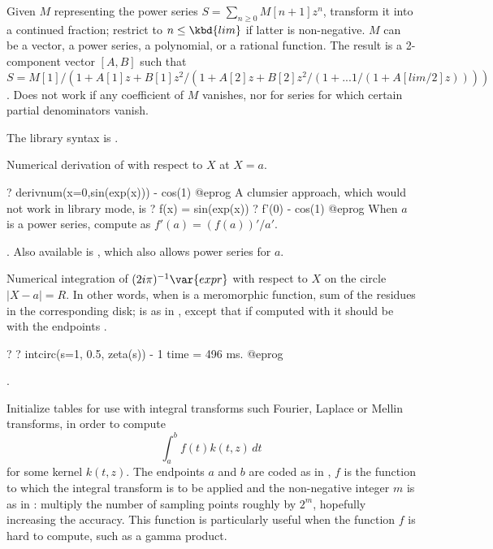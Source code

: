 \label{se:contfracinit}
Given $M$ representing the power series $S=\sum_{n\ge0} M[n+1]z^n$,
transform it into a continued fraction; restrict to $n\leq \kbd{lim}$
if latter is non-negative. $M$ can be a vector, a power
series, a polynomial, or a rational function.
The result is a 2-component vector $[A,B]$ such that
$S = M[1] / (1+A[1]z+B[1]z^2/(1+A[2]z+B[2]z^2/(1+...1/(1+A[lim/2]z))))$.
Does not work if any coefficient of $M$ vanishes, nor for series for
which certain partial denominators vanish.

The library syntax is .

\label{se:derivnum}
Numerical derivation of  with respect to $X$ at $X=a$.

\bprog
? derivnum(x=0,sin(exp(x))) - cos(1)
@eprog
A clumsier approach, which would not work in library mode, is
\bprog
? f(x) = sin(exp(x))
? f'(0) - cos(1)
@eprog
When $a$ is a power series, compute  as $f'(a) =
(f(a))'/a'$.

. Also
available is , which also allows power series for $a$.

\label{se:intcirc}
Numerical
integration of $(2i\pi)^{-1}\var{expr}$ with respect to $X$ on the circle
$|X-a| = R$.
In other words, when  is a meromorphic
function, sum of the residues in the corresponding disk;  is as in
, except that if computed with  it should be with
the endpoints \kbd{[-1, 1]}.

\bprog
? 
? intcirc(s=1, 0.5, zeta(s)) - 1
time = 496 ms.
@eprog

.

\label{se:intfuncinit}
Initialize tables for use with integral transforms such Fourier,
Laplace or Mellin transforms, in order to compute
$$ \int_a^b f(t) k(t,z) \, dt $$
for some kernel $k(t,z)$.
The endpoints $a$ and $b$ are coded as in , $f$ is the
function to which the integral transform is to be applied and the
non-negative integer $m$ is as in : multiply the number of
sampling points roughly by $2^m$, hopefully increasing the accuracy. This
function is particularly useful when the function $f$ is hard to compute,
such as a gamma product.

